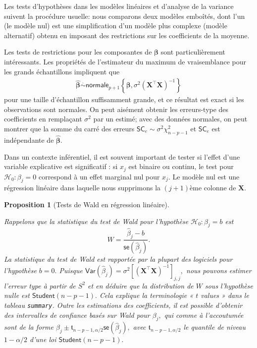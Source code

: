 \documentclass[
  11pt,
  letterpaper,
]{scrbook}
\theoremstyle{plain}
\newtheorem{proposition}{Proposition}[chapter]
\theoremstyle{plain}
\theoremstyle{definition}
\theoremstyle{definition}
\theoremstyle{remark}
\begin{document}
Les tests d'hypothèses dans les modèles linéaires et d'analyse de la
variance suivent la procédure usuelle: nous comparons deux modèles
emboîtés, dont l'un (le modèle nul) est une simplification d'un modèle
plus complexe (modèle alternatif) obtenu en imposant des restrictions
sur les coefficients de la moyenne.

Les tests de restrictions pour les composantes de \(\boldsymbol{\beta}\)
sont particulièrement intéressants. Les propriétés de l'estimateur du
maximum de vraisemblance pour les grands échantillons impliquent que
\begin{align*}
\widehat{\boldsymbol{\beta}} \stackrel{\cdot}{\sim}\mathsf{normale}_{p+1}\left\{\boldsymbol{\beta}, \sigma^2(\mathbf{X}^\top\mathbf{X})^{-1}\right\}
\end{align*} pour une taille d'échantillon suffisamment grande, et ce
résultat est exact si les observations sont normales. On peut aisément
obtenir les erreurs-type des coefficients en remplaçant \(\sigma^2\) par
un estimé; avec des données normales, on peut montrer que la somme du
carré des erreurs \(\mathsf{SC}_e \sim \sigma^2\chi^2_{n-p-1}\) et
\(\mathsf{SC}_e\) est indépendante de \(\widehat{\boldsymbol{\beta}}.\)

Dans un contexte inférentiel, il est souvent important de tester si
l'effet d'une variable explicative est significatif : si \(x_j\) est
binaire ou continu, le test pour \(\mathscr{H}_0 : \beta_j=0\)
correspond à un effet marginal nul pour \(x_j.\) Le modèle nul est une
régression linéaire dans laquelle nous supprimons la \((j+1)\)ème
colonne de \(\mathbf{X}.\)

\begin{proposition}[Tests de Wald en régression
linéaire]\protect\hypertarget{prp-wald}{}\label{prp-wald}

Rappelons que la statistique du test de Wald pour l'hypothèse
\(\mathscr{H}_0: \beta_j=b\) est
\[W = \frac{\widehat{\beta}_j - b}{\mathsf{se}(\widehat{\beta}_j)}.\] La
statistique du test de Wald est rapportée par la plupart des logiciels
pour l'hypothèse \(b=0.\) Puisque
\(\mathsf{Var}(\widehat{\beta}_j) = \sigma^2 [(\mathbf{X}^\top\mathbf{X})^{-1}]_{j,j},\)
nous pouvons estimer l'erreur type à partir de \(S^2\) et en déduire que
la distribution de \(W\) sous l'hypothèse nulle est
\(\mathsf{Student}(n-p-1).\) Cela explique la terminologie « \(t\)
values » dans le tableau \texttt{summary}. Outre les estimations des
coefficients, il est possible d'obtenir des intervalles de confiance
basés sur Wald pour \(\beta_j,\) qui comme à l'accoutumée sont de la
forme
\(\widehat{\beta}_j \pm \mathfrak{t}_{n-p-1,\alpha/2} \mathsf{se}(\widehat{\beta}_j),\)
avec \(\mathfrak{t}_{n-p-1,\alpha/2}\) le quantile de niveau
\(1-\alpha/2\) d'une loi \(\mathsf{Student}({n-p-1}).\)

\end{proposition}
\end{document}
